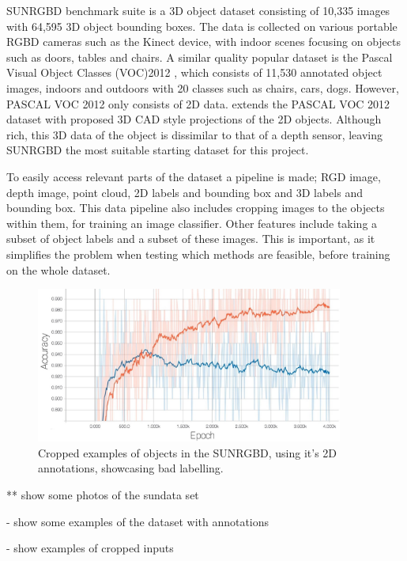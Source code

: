 \documentclass[11pt]{article}
\begin{document}
SUNRGBD benchmark suite \cite{SUNRGBD} is a 3D object dataset consisting of 10,335 images with 64,595 3D object bounding boxes. The data is collected on various portable RGBD cameras such as the Kinect device, with indoor scenes focusing on objects such as doors, tables and chairs. A similar quality popular dataset is the Pascal Visual Object Classes (VOC)2012 \cite{pascal-voc-2012}, which consists of 11,530 annotated object images, indoors and outdoors with 20 classes such as chairs, cars, dogs. However, PASCAL VOC 2012 only consists of 2D data. \cite{PASCAL_3D} extends the PASCAL VOC 2012 dataset with proposed 3D CAD style projections of the 2D objects. Although rich, this 3D data of the object is dissimilar to that of a depth sensor, leaving SUNRGBD the most suitable starting dataset for this project.

To easily access relevant parts of the dataset a pipeline is made; RGD image, depth image, point cloud, 2D labels and bounding box and 3D labels and bounding box. This data pipeline also includes cropping images to the objects within them, for training an image classifier. Other features include taking a subset of object labels and a subset of these images. This is important, as it simplifies the problem when testing which methods are feasible, before training on the whole dataset.

\begin{figure}[H]
  \begin{center}
    \includegraphics[width=0.9\textwidth]{images/inception_SUNRGBD.jpg}
  \end{center}
  \caption{Cropped examples of objects in the SUNRGBD, using it's 2D annotations, showcasing bad labelling.}
  \label{fig:dodgy_crops}
\end{figure}
** show some photos of the sundata set

- show some examples of the dataset with annotations

- show examples of cropped inputs
\end{document}
